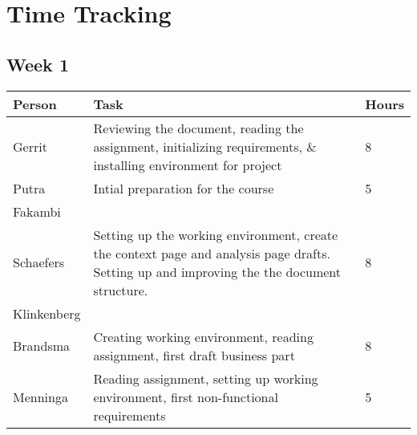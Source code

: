 \chapter{Time Tracking}
\label{App: Time Tracking}


\section{Week 1}
\begin{tabular}{L{0.2\textwidth} L{0.7\textwidth} L{0.1\textwidth}}
    \textbf{Person} & \textbf{Task} & \textbf{Hours} \\ \toprule
	Gerrit & Reviewing the document, reading the assignment, initializing requirements, \& installing environment for project & 8 \\ \midrule
	Putra & Intial preparation for the course & 5 \\ \midrule
	Fakambi & & \\ \midrule
	Schaefers & Setting up the working environment, create the context page and analysis page drafts. Setting up and improving the the document structure. & 8\\ \midrule
	Klinkenberg & & \\ \midrule
	Brandsma & Creating working environment, reading assignment, first draft business part & 8\\ \midrule
	Menninga & Reading assignment, setting up working environment, first non-functional requirements & 5 \\ \bottomrule
\end{tabular}

